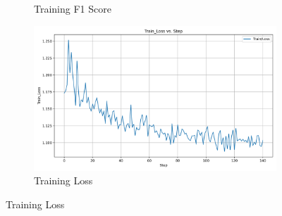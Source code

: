 \documentclass[12pt]{article}
\begin{document}
\begin{figure}[H]
\begin{subfigure}[b]{0.32\textwidth}
		\caption{Training F1 Score}
	\end{subfigure}
	\hfill
	\begin{subfigure}[b]{0.32\textwidth}
		\includegraphics[width=\linewidth]{BERT_Train_Loss.png}
		\caption{Training Loss}
	\end{subfigure}
	

\end{figure}
\end{document}
